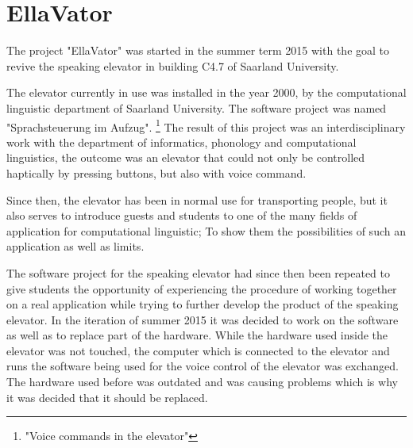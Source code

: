 \documentclass[a4paper, 12pt]{article}
\begin{document}


\pagestyle{empty}

\pagestyle{plain}
\setcounter{page}{1}
\tableofcontents
\cleardoublepage

\section{EllaVator}

The project "EllaVator" was started in the summer term 2015 with the goal to
revive the speaking elevator in building C4.7 of Saarland University.\newline

The elevator currently in use was installed in the year 2000, by the
computational linguistic department of Saarland University. The software
project was named "Sprachsteuerung im Aufzug". \footnote {"Voice commands in the elevator"}
The result of this project was an interdisciplinary work with the department of informatics, phonology and computational linguistics, the outcome was an elevator that could not only be controlled haptically by pressing buttons, but also with voice command. ~\cite{SprachsteuerungimAufzug} \newline

Since then, the elevator has been in normal use for transporting people, but it also serves to introduce guests and students to one of the many fields of application for computational linguistic; 
To show them the possibilities of such an application as well as limits. \newline

The software project for the speaking elevator had since then been repeated to give students the opportunity of experiencing the procedure of working together on a real application while trying to further develop the product of the speaking elevator.
In the iteration of summer 2015 it was decided to work on the software as well as to replace part of the hardware.
While the hardware used inside the elevator was not touched, the computer which is connected to the elevator and runs the software being used for the voice control of the elevator was exchanged.
The hardware used before was outdated and was causing problems which is why it was decided that it should be replaced. \newline
\end{document}
